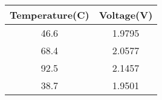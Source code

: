\begin{tabular}{|c|c|}
\hline
\textbf{Temperature(C)} & \textbf{Voltage(V)} \\
\hline
46.6 & 1.9795\\
\hline
68.4 & 2.0577 \\
\hline
92.5 & 2.1457 \\
\hline
38.7 & 1.9501\\
\hline
\end{tabular}